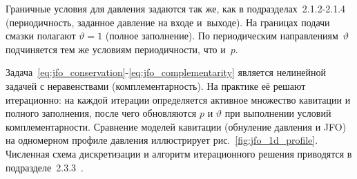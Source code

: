 Граничные условия для давления задаются так же, как в
подразделах~2.1.2-2.1.4 (периодичность, заданное давление на входе
и~выходе).  На границах подачи смазки полагают $\vartheta = 1$
(полное заполнение).  По периодическим направлениям~$\vartheta$
подчиняется тем же условиям периодичности, что и~$p$.

Задача~\eqref{eq:jfo_conservation}-\eqref{eq:jfo_complementarity}
является нелинейной задачей с неравенствами (комплементарность).
На практике её решают итерационно: на каждой итерации определяется
активное множество кавитации и полного заполнения, после чего
обновляются $p$ и $\vartheta$ при выполнении условий комплементарности.
Сравнение моделей кавитации (обнуление давления и JFO) на одномерном профиле давления иллюстрирует рис.~\ref{fig:jfo_1d_profile}. Численная схема дискретизации и алгоритм итерационного решения
приводятся в подразделе~2.3.3~\cite{elrod1975}.
